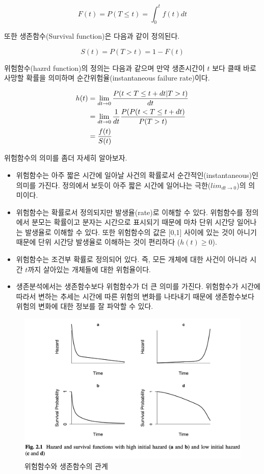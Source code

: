 \documentclass[
]{book}
\theoremstyle{definition}
\theoremstyle{definition}
\theoremstyle{definition}
\theoremstyle{definition}
\theoremstyle{remark}
\begin{document}
\[ F(t) = P(T \le t) = \int_0^t f(t) dt \]

또한 생존함수(Survival function)은 다음과 같이 정의된다.

\[ S(t) = P (T > t) = 1-F(t) \]

위험함수(hazrd function)의 정의는 다음과 같으며 만약 생존시간이 \(t\) 보다 클때 바로 사망할 확률을 의미하며 순간위험율(instantaneous failure rate)이다.

\begin{align}
h(t) & = \lim_{dt \rightarrow 0} \frac{ P(t < T \le t+ dt | T > t) }{dt} \\ \notag
      & = \lim_{dt \rightarrow 0} \frac{1}{dt} \frac{P(P(t < T \le t+ dt )}{P(T >t)} \\ \notag
     & = \frac{f(t)}{S(t)}
\label{eq:hazardrate}
\end{align}

위험함수의 의미를 좀더 자세히 알아보자.

\begin{itemize}
\item
  위험함수는 아주 짧은 시간에 일아날 사건의 확률로서 순간적인(instantaneous)인 의미를 가진다. 정의에서 보듯이 아주 짧은 시간에 일어나는 극한(\(lim_{dt \rightarrow 0}\))의 의미이다.
\item
  위험함수는 확률로서 정의되지만 발생율(rate)로 이해할 수 있다. 위험함수를 정의에서 분모는 확률이고 분자는 시간으로 표시되기 때문에 마차 단위 시간당 일어나는 발생율로 이해할 수 있다. 또한 위험함수의 값은 {[}0,1{]} 사이에 있는 것이 아니기 때문에 단위 시간당 발생율로 이해하는 것이 편리하다 (\(h(t) \ge 0\)).
\item
  위험함수는 조건부 확률로 정의되어 있다. 즉, 모든 개체에 대한 사건이 아니라 시간 \(t\)까지 살아있는 개체들에 대한 위험율이다.
\item
  생존분석에서는 생존함수보다 위험함수가 더 큰 의미를 가진다. 위험함수가 시간에 따라서 변하는 추세는 시간에 따른 위험의 변화를 나타내기 때문에 생존함수보다 위험의 변화에 대한 정보를 잘 파악할 수 있다.
\end{itemize}

\begin{figure}
\centering
\includegraphics{images/hazard-01.png}
\caption{위험함수와 생존함수의 관계}
\end{figure}
\end{document}
